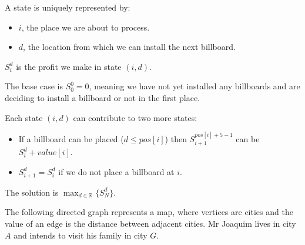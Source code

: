 {\ansseparator

A state is uniquely represented by:
\begin{itemize}
    \item $i$, the place we are about to process.
    \item $d$, the location from which we can install the next billboard.
\end{itemize}

$S_i^d$ is the profit we make in state $(i,d)$.

The base case is $S_0^0 = 0$, meaning we have not yet installed any billboards and are deciding to install a billboard or not in the first place.

Each state $(i,d)$ can contribute to two more states:
\begin{itemize}
    \item If a billboard can be placed ($d \leq pos[i]$) then $S_{i+1}^{pos[i]+5-1}$ can be $S_i^d + value[i]$.
    \item $S_{i+1}^d = S_i^d$ if we do not place a billboard at $i$.
\end{itemize}

The solution is $\max_{d \in \mathbb{R}}\{S_{N}^d\}$.

\newpage


The following directed graph represents a map, where vertices are cities and the value of an edge is the distance between adjacent cities. Mr Joaquim lives in city $A$ and intends to visit his family in city $G$.

\begin{center}
\end{center}}
